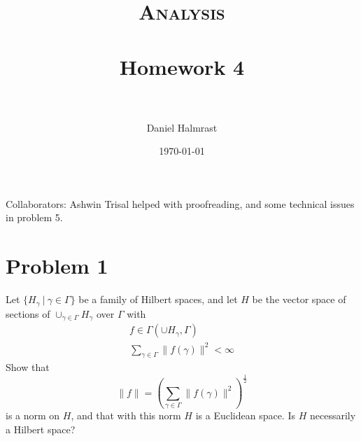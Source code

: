 \documentclass[fontsize=11pt]{scrartcl} %
\title{	
\normalfont \normalsize 
\textsc{Analysis} \\ [25pt] %
\horrule{0.5pt} \\[0.4cm] %
\huge Homework 4 \\ %
\horrule{2pt} \\[0.5cm] %
}
\author{Daniel Halmrast} %
\date{\normalsize\today} %
\numberwithin{equation}{section} %
\numberwithin{figure}{section} %
\numberwithin{table}{section} %
\begin{document}
\maketitle %

Collaborators: Ashwin Trisal helped with proofreading, and some technical issues
in problem 5.
\section*{Problem 1}
Let $\{H_{\gamma}\ |\ \gamma\in\Gamma\}$ be a family of Hilbert spaces, and let
$H$ be the vector space of sections of $\cup_{\gamma\in\Gamma}H_{\gamma}$ over
$\Gamma$ with
\[
\begin{aligned}
    f\in \Gamma(\cup H_{\gamma},\Gamma)\\
    \sum_{\gamma\in\Gamma}\|f(\gamma)\|^2 < \infty
\end{aligned}
\]
Show that
\[
    \|f\| = \left( \sum_{\gamma\in\Gamma}\|f(\gamma)\|^2
    \right)^{\frac{1}{2}}
\]
is a norm on $H$, and that with this norm $H$ is a Euclidean space. Is $H$
necessarily a Hilbert space?
\\
\\
\end{document}
